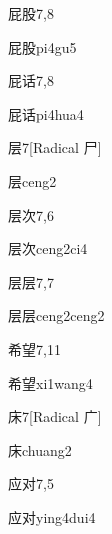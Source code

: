\begin{entry}{屁股}{7,8}
  \begin{phonetics}{屁股}{pi4gu5}
  \end{phonetics}
\end{entry}

\begin{entry}{屁话}{7,8}
  \begin{phonetics}{屁话}{pi4hua4}
  \end{phonetics}
\end{entry}

\begin{entry}{层}{7}[Radical ⼫]
  \begin{phonetics}{层}{ceng2}
  \end{phonetics}
\end{entry}

\begin{entry}{层次}{7,6}
  \begin{phonetics}{层次}{ceng2ci4}
  \end{phonetics}
\end{entry}

\begin{entry}{层层}{7,7}
  \begin{phonetics}{层层}{ceng2ceng2}
  \end{phonetics}
\end{entry}

\begin{entry}{希望}{7,11}
  \begin{phonetics}{希望}{xi1wang4}
  \end{phonetics}
\end{entry}

\begin{entry}{床}{7}[Radical ⼴]
  \begin{phonetics}{床}{chuang2}
  \end{phonetics}
\end{entry}

\begin{entry}{应对}{7,5}
  \begin{phonetics}{应对}{ying4dui4}
  \end{phonetics}
\end{entry}

